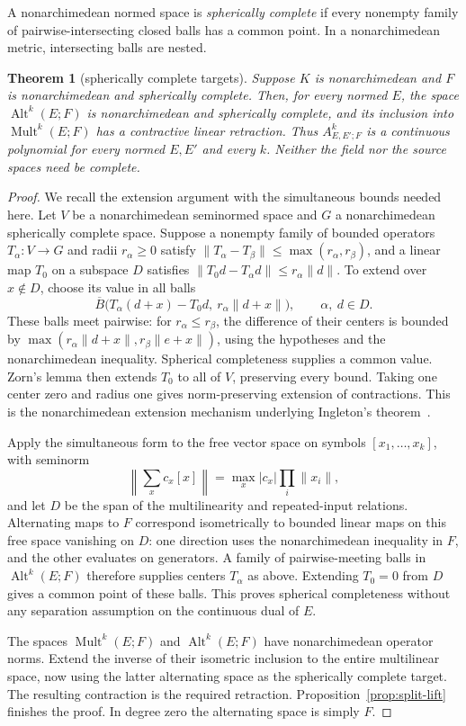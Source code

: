\documentclass[11pt]{amsart}
\newtheorem{theorem}{Theorem}[section]
\theoremstyle{definition}
\theoremstyle{remark}
\numberwithin{equation}{section}
\newcommand{\Alt}{\operatorname{Alt}}
\newcommand{\Mult}{\operatorname{Mult}}
\newcommand{\abs}[1]{\lvert #1\rvert}
\newcommand{\norm}[1]{\lVert #1\rVert}
\begin{document}
A nonarchimedean normed space is \emph{spherically complete} if every nonempty family of pairwise-intersecting
closed balls has a common point. In a nonarchimedean metric, intersecting balls are nested.

\begin{theorem}[spherically complete targets]\label{thm:spherical}
Suppose $K$ is nonarchimedean and $F$ is nonarchimedean and spherically complete. Then, for every normed $E$, the space $\Alt^k(E;F)$ is nonarchimedean and spherically complete, and its inclusion into $\Mult^k(E;F)$ has a contractive linear retraction. Thus $A^k_{E,E';F}$ is a continuous polynomial for every normed $E,E'$ and every $k$. Neither the field nor the source spaces need be complete.
\end{theorem}
\begin{proof}
We recall the extension argument with the simultaneous bounds needed here. Let $V$ be a nonarchimedean seminormed space and $G$ a nonarchimedean spherically complete space. Suppose a nonempty family of bounded operators $T_\alpha\colon V\to G$ and radii $r_\alpha\ge0$ satisfy
$\norm{T_\alpha-T_\beta}\le\max(r_\alpha,r_\beta)$, and a linear map $T_0$ on a subspace $D$ satisfies
$\norm{T_0d-T_\alpha d}\le r_\alpha\norm d$.
To extend over $x\notin D$, choose its value in all balls
\[
 \overline B\bigl(T_\alpha(d+x)-T_0d,\ r_\alpha\norm{d+x}\bigr),
 \qquad \alpha,\ d\in D.
\]
These balls meet pairwise: for $r_\alpha\le r_\beta$, the difference of their centers is bounded by
$\max(r_\alpha\norm{d+x},r_\beta\norm{e+x})$, using the hypotheses and the nonarchimedean inequality. Spherical completeness supplies a common value. Zorn's lemma then extends $T_0$ to all of $V$, preserving every bound. Taking one center zero and radius one gives norm-preserving extension of contractions. This is the nonarchimedean extension mechanism underlying Ingleton's theorem~\cite{In}.

Apply the simultaneous form to the free vector space on symbols $[x_1,\ldots,x_k]$, with seminorm
\[
 \left\lVert\sum_x c_x[x]\right\rVert
 =\max_x\abs{c_x}\prod_i\norm{x_i},
\]
and let $D$ be the span of the multilinearity and repeated-input relations. Alternating maps to $F$ correspond isometrically to bounded linear maps on this free space vanishing on $D$: one direction uses the nonarchimedean inequality in $F$, and the other evaluates on generators. A family of pairwise-meeting balls in $\Alt^k(E;F)$ therefore supplies centers $T_\alpha$ as above. Extending $T_0=0$ from $D$ gives a common point of these balls. This proves spherical completeness without any separation assumption on the continuous dual of $E$.

The spaces $\Mult^k(E;F)$ and $\Alt^k(E;F)$ have nonarchimedean operator norms. Extend the inverse of their isometric inclusion to the entire multilinear space, now using the latter alternating space as the spherically complete target. The resulting contraction is the required retraction. Proposition~\ref{prop:split-lift} finishes the proof. In degree zero the alternating space is simply $F$.
\end{proof}
\end{document}
